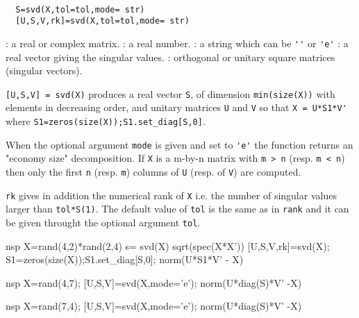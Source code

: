 \begin{mandesc}
   \\ %
\end{mandesc}
\begin{calling_sequence}
\begin{verbatim}
  S=svd(X,tol=tol,mode= str)  
  [U,S,V,rk]=svd(X,tol=tol,mode= str)  
\end{verbatim}
\end{calling_sequence}
\begin{parameters}
  \begin{varlist}
    : a real or complex matrix.
    : a real number.
    : a string which can be \verb!''! or \verb!'e'!
    : a real vector giving the singular values.
    : orthogonal or unitary square matrices (singular vectors).
  \end{varlist}
\end{parameters}
\begin{mandescription}
  \verb![U,S,V] = svd(X)! produces a real vector \verb!S!, of dimension 
  \verb!min(size(X))! with elements in decreasing order, and unitary matrices
  \verb!U! and \verb!V! so that \verb!X = U*S1*V'! where 
  \verb!S1=zeros(size(X));S1.set_diag[S,0]!. 
  
  When the optional argument \verb!mode! is given and set to \verb!'e'! 
  the function returns an "economy size" decomposition. 
  If \verb!X! is a m-by-n matrix with \verb!m > n! (resp. \verb!m < n!) 
  then only the first \verb!n! (resp. \verb!m!) 
  columns of \verb!U! (resp. of \verb!V!) are computed. 

  \verb!rk! gives in addition the numerical rank of \verb!X! i.e. the number of
  singular values larger than \verb!tol*S(1)!. The default value of \verb!tol!  is
  the same as in \verb!rank! and it can be given throught the optional argument
  \verb!tol!.
\end{mandescription}
\begin{examples}
  \begin{mintednsp}{nsp}
    X=rand(4,2)*rand(2,4)
    s= svd(X)
    sqrt(spec(X*X'))
    [U,S,V,rk]=svd(X);
    S1=zeros(size(X));S1.set_diag[S,0];
    norm(U*S1*V' - X)
  \end{mintednsp}
  \begin{mintednsp}{nsp}
    X=rand(4,7);
    [U,S,V]=svd(X,mode='e');
    norm(U*diag(S)*V' -X) 
  \end{mintednsp}
  \begin{mintednsp}{nsp}
    X=rand(7,4);
    [U,S,V]=svd(X,mode='e');
    norm(U*diag(S)*V' -X) 
  \end{mintednsp}
\end{examples}
\begin{manseealso}
         
\end{manseealso}

